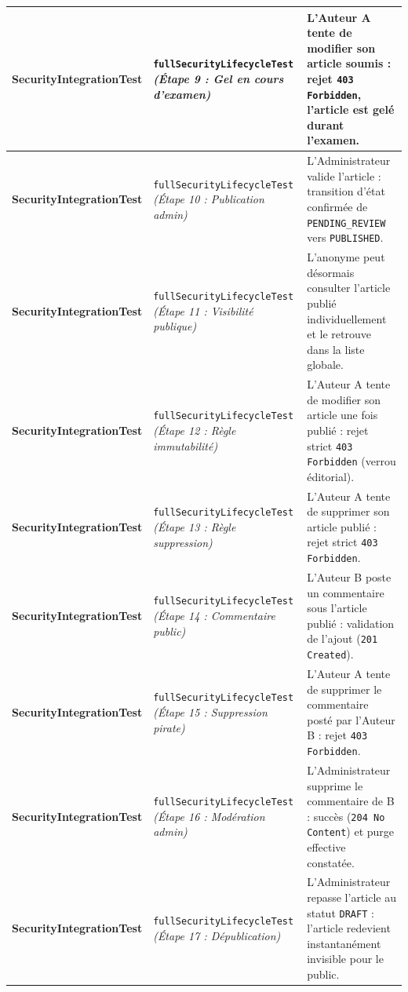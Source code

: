 \documentclass[11pt,a4paper]{article}
\newcommand{\testmethod}[1]{{\ttfamily\scriptsize\nolinkurl{#1}}}
\begin{document}
\begin{longtable}{|>{\raggedright\arraybackslash\bfseries}p{3.6cm}|>{\raggedright\arraybackslash}p{4.3cm}|>{\raggedright\arraybackslash}p{6.8cm}|}
\hline
SecurityIntegrationTest & \testmethod{fullSecurityLifecycleTest} \newline \textit{(Étape 9 : Gel en cours d'examen)} & L'Auteur A tente de modifier son article soumis : rejet \texttt{403 Forbidden}, l'article est gelé durant l'examen. \\
\hline
SecurityIntegrationTest & \testmethod{fullSecurityLifecycleTest} \newline \textit{(Étape 10 : Publication admin)} & L'Administrateur valide l'article : transition d'état confirmée de \texttt{PENDING\_REVIEW} vers \texttt{PUBLISHED}. \\
\hline
SecurityIntegrationTest & \testmethod{fullSecurityLifecycleTest} \newline \textit{(Étape 11 : Visibilité publique)} & L'anonyme peut désormais consulter l'article publié individuellement et le retrouve dans la liste globale. \\
\hline
SecurityIntegrationTest & \testmethod{fullSecurityLifecycleTest} \newline \textit{(Étape 12 : Règle immutabilité)} & L'Auteur A tente de modifier son article une fois publié : rejet strict \texttt{403 Forbidden} (verrou éditorial). \\
\hline
SecurityIntegrationTest & \testmethod{fullSecurityLifecycleTest} \newline \textit{(Étape 13 : Règle suppression)} & L'Auteur A tente de supprimer son article publié : rejet strict \texttt{403 Forbidden}. \\
\hline
SecurityIntegrationTest & \testmethod{fullSecurityLifecycleTest} \newline \textit{(Étape 14 : Commentaire public)} & L'Auteur B poste un commentaire sous l'article publié : validation de l'ajout (\texttt{201 Created}). \\
\hline
SecurityIntegrationTest & \testmethod{fullSecurityLifecycleTest} \newline \textit{(Étape 15 : Suppression pirate)} & L'Auteur A tente de supprimer le commentaire posté par l'Auteur B : rejet \texttt{403 Forbidden}. \\
\hline
SecurityIntegrationTest & \testmethod{fullSecurityLifecycleTest} \newline \textit{(Étape 16 : Modération admin)} & L'Administrateur supprime le commentaire de B : succès (\texttt{204 No Content}) et purge effective constatée. \\
\hline
SecurityIntegrationTest & \testmethod{fullSecurityLifecycleTest} \newline \textit{(Étape 17 : Dépublication)} & L'Administrateur repasse l'article au statut \texttt{DRAFT} : l'article redevient instantanément invisible pour le public. \\
\end{longtable}
\endgroup
\end{document}
